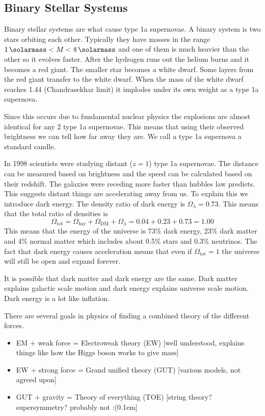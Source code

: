 \subsection*{Binary Stellar Systems}

Binary stellar systems are what cause type 1a supernovae. A binary system is two stars orbiting each other. Typically they have masses in the range \(\SI{1}{\solarmass}<M<\SI{8}{\solarmass}\) and one of them is much heavier than the other so it evolves faster. After the hydrogen runs out the helium burns and it becomes a red giant. The smaller star becomes a white dwarf. Some layers from the red giant transfer to the white dwarf. When the mass of the white dwarf reaches \SI{1.44}{\solarmass} (Chandrasekhar limit) it implodes under its own weight as a type 1a supernova.

Since this occurs due to fundamental nuclear physics the explosions are almost identical for any 2 type 1a supernovae. This means that using their observed brightness we can tell how far away they are. We call a type 1a supernova a standard candle.

In 1998 scientists were studying distant (\(z=1\)) type 1a supernovae. The distance can be measured based on brightness and the speed can be calculated based on their redshift. The galaxies were receding more faster than hubbles law predicts. This suggests distant things are accelerating away from us. To explain this we introduce dark energy. The density ratio of dark energy is \(\Omega_\lambda=0.73\). This means that the total ratio of densities is
\[\Omega_\mathrm{tot}=\Omega_\mathrm{bar}+\Omega_\mathrm{DM}+\Omega_\lambda=0.04+0.23+0.73=1.00\]
This means that the energy of the universe is 73\% dark energy, 23\% dark matter and 4\% normal matter which includes about 0.5\% stars and 0.3\% neutrinos. The fact that dark energy causes acceleration means that even if \(\Omega_\mathrm{tot}=1\) the universe will still be open and expand forever.

It is possible that dark matter and dark energy are the same. Dark matter explains galactic scale motion and dark energy explains universe scale motion. Dark energy is a lot like inflation.

There are several goals in physics of finding a combined theory of the different forces.
\begin{itemize}
\item EM + weak force = Electroweak theory (EW) [well understood, explains things like how the Higgs boson works to give mass]
\item EW + strong force = Grand unified theory (GUT) [various models, not agreed upon]
\item GUT + gravity = Theory of everything (TOE) [string theory? supersymmetry? probably not :(\kern0.1em]
\end{itemize}